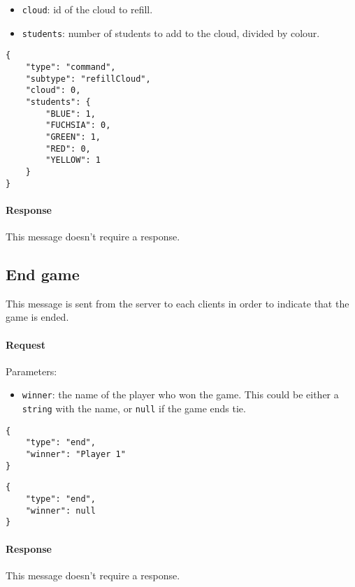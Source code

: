 \documentclass[a4paper]{article}
\begin{document}
	\begin{itemize}
		\item \verb|cloud|: id of the cloud to refill.
		\item \verb|students|: number of students to add to the cloud, divided by colour.
	\end{itemize}

	\begin{verbatim}
{
	"type": "command",
	"subtype": "refillCloud",
	"cloud": 0,
	"students": {
		"BLUE": 1,
		"FUCHSIA": 0,
		"GREEN": 1,
		"RED": 0,
		"YELLOW": 1
	}
}
	\end{verbatim}
	
	\paragraph{Response} This message doesn't require a response.
	
	\subsection{End game}
	
	This message is sent from the server to each clients in order to indicate that the game is ended.
	
	\paragraph{Request} Parameters:
	
	\begin{itemize}
		\item \verb|winner|: the name of the player who won the game. This could be either a \verb|string| with the name, or \texttt{null} if the game ends tie.
	\end{itemize}

	\begin{multicols}{2}
		\begin{verbatim}
{
	"type": "end",
	"winner": "Player 1"
}
		\end{verbatim}
		\begin{verbatim}
{
	"type": "end",
	"winner": null
}
		\end{verbatim}
	\end{multicols}
	
	\paragraph{Response} This message doesn't require a response.
	
\end{document}

